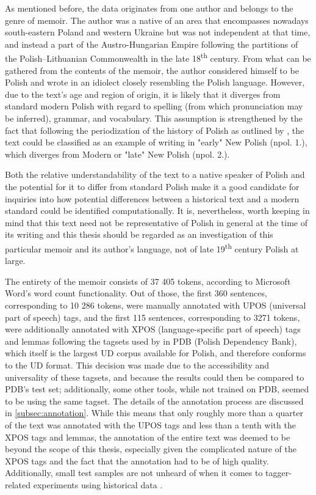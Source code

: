 As mentioned before, the data originates from one author and belongs to the genre of memoir. The author was a native of an area that encompasses nowadays south-eastern Poland and western Ukraine but was not independent at that time, and instead a part of the Austro-Hungarian Empire following the partitions of the Polish–Lithuanian Commonwealth in the late 18\textsuperscript{th} century. From what can be gathered from the contents of the memoir, the author considered himself to be Polish and wrote in an idiolect closely resembling the Polish language. However, due to the text's age and region of origin, it is likely that it diverges from standard modern Polish with regard to spelling (from which pronunciation may be inferred), grammar, and vocabulary. This assumption is strengthened by the fact that following the periodization of the history of Polish as outlined by \citet{długosz-kurczabowa_dubisz_2006}, the text could be classified as an example of writing in "early" New Polish (npol. 1.), which diverges from Modern or "late" New Polish (npol. 2.).

Both the relative understandability of the text to a native speaker of Polish and the potential for it to differ from standard Polish make it a good candidate for inquiries into how potential differences between a historical text and a modern standard could be identified computationally. It is, nevertheless, worth keeping in mind that this text need not be representative of Polish in general at the time of its writing and this thesis should be regarded as an investigation of this particular memoir and its author's language, not of late 19\textsuperscript{th} century Polish at large.

The entirety of the memoir consists of 37 405 tokens, according to Microsoft Word's word count functionality. Out of those, the first 360 sentences, corresponding to 10 286 tokens, were manually annotated with UPOS (universal part of speech) tags, and the first 115 sentences, corresponding to 3271 tokens, were additionally annotated with XPOS (language-specific part of speech) tags and lemmas following the tagsets used by \citet{wroblewska-2018-extended} in PDB (Polish Dependency Bank), which itself is the largest UD corpus available for Polish, and therefore conforms to the UD format. This decision was made due to the accessibility and universality of these tagsets, and because the results could then be compared to PDB's test set; additionally, some other tools, while not trained on PDB, seemed to be using the same tagset. The details of the annotation process are discussed in \autoref{subsec:annotation}. While this means that only roughly more than a quarter of the text was annotated with the UPOS tags and less than a tenth with the XPOS tags and lemmas, the annotation of the entire text was deemed to be beyond the scope of this thesis, especially given the complicated nature of the XPOS tags and the fact that the annotation had to be of high quality. Additionally, small test samples are not unheard of when it comes to tagger-related experiments using historical data \citep{bollmann-2013-pos, hupkes16, rayson07}. 

